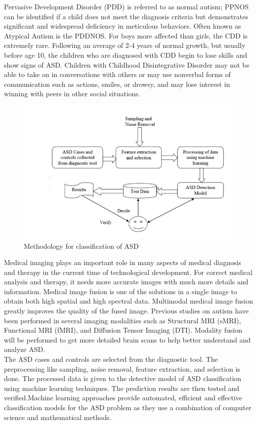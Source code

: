 Pervasive Development Disorder (PDD) is referred to as normal autism; PPNOS can be identified if a child does not meet the diagnosis criteria but demonstrates significant and widespread deficiency in meticulous behaviors. Often known as Atypical Autism is the PDDNOS. For boys more affected than girls, the CDD is extremely rare. Following an average of 2-4 years of normal growth, but usually before age 10, the children who are diagnosed with CDD begin to lose skills and show signs of ASD. Children with Childhood Disintegrative Disorder may not be able to take on in conversations with others or may use nonverbal forms of communication such as actions, smiles, or drowsy, and may lose interest in winning with peers in other social situations. \\
\begin{figure}[h]
\label{ss}
\centering
\includegraphics[width= 14 cm]{methodology for classification of asd.jpg}
\caption{Methodology for classification of ASD}
\end{figure}
Medical imaging plays an important role in many aspects of medical diagnosis and therapy in the current time of technological development.  For correct medical analysis and therapy, it needs more accurate images with much more details and information. Medical image fusion is one of the solutions in a single image to obtain both high spatial and high spectral data. Multimodal medical image fusion greatly improves the quality of the fused image. Previous studies on autism have been performed in several imaging modalities such as Structural MRI (sMRI), Functional MRI (fMRI), and Diffusion Tensor Imaging (DTI). Modality fusion will be performed to get more detailed brain scans to help better understand and analyze ASD. \\
The ASD cases and controls are selected from the diagnostic tool. The preprocessing like sampling, noise removal, feature extraction, and selection is done. The processed data is given to the detective model of ASD classification using machine learning techniques. The prediction results are then tested and verified.Machine learning approaches provide automated, efficient and effective classification models for the ASD problem as they use a combination of computer science and mathematical methods. 


